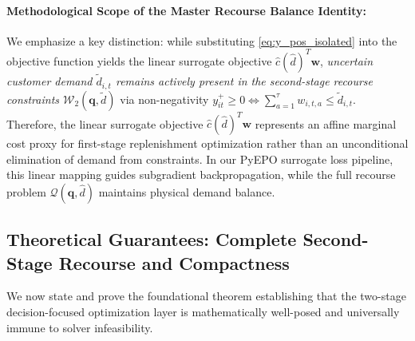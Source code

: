 \documentclass[11pt,a4paper]{article}
\theoremstyle{definition}
\theoremstyle{remark}
\begin{document}
\paragraph{Methodological Scope of the Master Recourse Balance Identity:}
We emphasize a key distinction: while substituting \eqref{eq:y_pos_isolated} into the objective function yields the linear surrogate objective $\hat{c}(\hat{d})^T \mathbf{w}$, \textit{uncertain customer demand $\tilde{d}_{i,t}$ remains actively present in the second-stage recourse constraints $\mathcal{W}_2(\mathbf{q}, \tilde{d})$} via non-negativity $y_{it}^+ \ge 0 \iff \sum_{a=1}^\tau w_{i,t,a} \le \tilde{d}_{i,t}$. Therefore, the linear surrogate objective $\hat{c}(\hat{d})^T \mathbf{w}$ represents an affine marginal cost proxy for first-stage replenishment optimization rather than an unconditional elimination of demand from constraints. In our PyEPO surrogate loss pipeline, this linear mapping guides subgradient backpropagation, while the full recourse problem $\mathcal{Q}(\mathbf{q}, \hat{d})$ maintains physical demand balance.

\subsection{Theoretical Guarantees: Complete Second-Stage Recourse and Compactness}
\label{sec:theoretical_guarantees}

We now state and prove the foundational theorem establishing that the two-stage decision-focused optimization layer is mathematically well-posed and universally immune to solver infeasibility.
\end{document}
